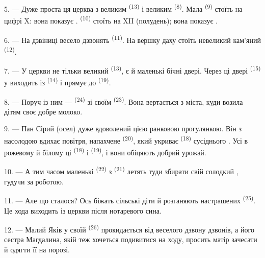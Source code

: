 \VUsaut{3.4mm}
\VUsaut{3.0mm}

5. --- Дуже проста ця церква з великим 
\textsuperscript{(13)} і великим  \textsuperscript{(8)}. Мала
 \textsuperscript{(9)} стоїть на цифрі X: вона показує
.  \textsuperscript{(10)} стоїть на XII (полудень);
вона показує .

6. --- На дзвіниці весело дзвонять  \textsuperscript{(11)}. На
вершку даху стоїть невеликий кам'яний  \textsuperscript{(12)}.

7. --- У церкви не тільки великий  \textsuperscript{(13)}, є й
маленькі бічні двері. Через ці двері  \textsuperscript{(15)} у
 виходить із  \textsuperscript{(14)} і прямує до
 \textsuperscript{(19)}.

8. --- Поруч із ним ---  \textsuperscript{(24)} зі своїм
 \textsuperscript{(23)}. Вона вертається з міста, куди возила дітям
своє добре молоко.

\VUsaut{4.0mm}
\VUsaut{3.4mm}

9. --- Пан Сірий (осел) дуже вдоволений цією ранковою прогулянкою. Він з
насолодою вдихає повітря, напахчене  \textsuperscript{(20)}, який
укриває  \textsuperscript{(18)} сусіднього
. Усі в рожевому й білому ці 
\textsuperscript{(18)} і  \textsuperscript{(19)}, і
вони обіцяють добрий урожай.

10. --- А тим часом маленькі  \textsuperscript{(22)} з
 \textsuperscript{(21)} летять туди збирати свій солодкий
, гудучи за роботою.

11. --- Але що сталося? Ось біжать сільські діти й розганяють настрашених
 \textsuperscript{(25)}. Це хода виходить із церкви після
 нотаревого сина.

12. --- Малий Яків у своїй  \textsuperscript{(26)} прокидається
від веселого дзвону дзвонів, а його сестра Магдалина, якій теж хочеться
подивитися на ходу, просить матір зачесати й одягти її на порозі.

